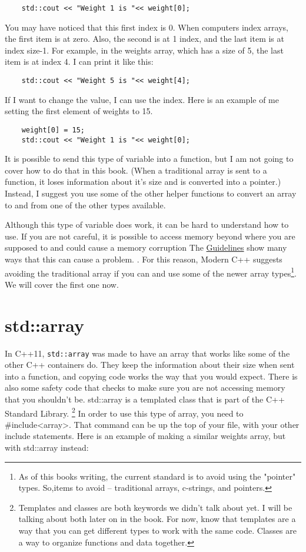 \begin{verbatim}
    std::cout << "Weight 1 is "<< weight[0];
\end{verbatim}
You may have noticed that this first index is 0. When computers index arrays, the first item is at zero. Also,
the second is at 1 index, and the last item is at index
size-1. For example, in the weights array, which has a size
of 5, the last item is at index 4. I can print it like this:
\begin{verbatim}
    std::cout << "Weight 5 is "<< weight[4];
\end{verbatim}
If I want to change the value, I can use the index. Here
is an example of me setting the first element of weights
to 15.
\begin{verbatim}
    weight[0] = 15;
    std::cout << "Weight 1 is "<< weight[0];
\end{verbatim}

It is possible to send this type of variable into a
function, but I am not going to cover how to do that
in this book. (When a traditional array is sent to a function, it loses information about it's size and is
converted into a pointer.) Instead, I suggest you use some of the
other helper functions to convert an array to and from
one of the other types available. 


Although this type of variable does work, it
can be hard to understand how to use. If you are not careful, 
it is possible to access memory beyond where you are supposed to and could cause a memory corruption
The \href{https://isocpp.github.io/CppCoreGuidelines/CppCoreGuidelines#p7-catch-run-time-errors-early}{Guidelines} show many ways that this can cause a problem. . For this reason, Modern C++ suggests avoiding the traditional array if you can and use some of the 
newer array types\footnote{As of this books writing, the current standard is to avoid using the "pointer" types. So,items to avoid -- traditional arrays, c-strings, and pointers.}. We will cover the first one now.

\section{std::array}
\label{stdarray}
In C++11, {\tt std::array} was made to have an array that works like
some of the other C++ containers do. They keep the information about 
their size when sent into a function, and
copying code works the way that you would expect. There is
also some safety code that checks to make sure you are not 
accessing memory that you shouldn't be. std::array is a templated class
that is part of the C++ Standard Library. \footnote{Templates and classes
are both keywords we didn't talk about yet. I will be talking about both
later on in the book. For now, know that templates are a way that you can
get different types to work with the same code. Classes are a way to organize
functions and data together.}
In order to use this
type of array, you need to \#include<array>. That command can
be up the top of your file, with your other include statements. Here is an example of making a similar weights array, but with std::array instead:

